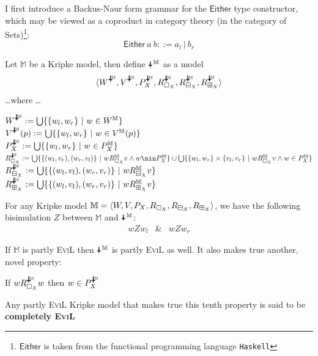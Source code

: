 I first introduce a Backus-Naur form grammar for the $\mathsf{Either}$ type constructor, which may be viewed as a coproduct in category theory (in the category of Sets)\footnote{$\mathsf{Either}$ is taken from the functional programming language \texttt{Haskell}}:
\[ \mathsf{Either}\ a\ b ::= a_l \ |\ b_r \]
\begin{mydef}
Let $\mathbb{M}$ be a Kripke model, then define $\invis^\mathbb{M}$ as a model
\[\la W^{\invis^\mathbb{M}},V^{\invis^\mathbb{M}}, P^{\invis^\mathbb{M}}_X,R^{\invis^\mathbb{M}}_{\Nec_X},R^{\invis^\mathbb{M}}_{\BB_X},R^{\invis^\mathbb{M}}_{\BBI_X}\ra\] 
\ldots where \ldots
\begin{tabbing}
$W^{\invis^\mathbb{M}} := \bigcup\{\{w_l,w_r\}\ |\ w\in W^\mathbb{M}\}$\\
$V^{\invis^\mathbb{M}}(p) := \bigcup\{\{w_l,w_r\}\ |\ w\in V^\mathbb{M}(p)\}$\\
$P^{\invis^\mathbb{M}}_X := \bigcup\{\{w_l,w_r\}\ |\  w\in P^\mathbb{M}_X\}$\\
$R^{\invis^\mathbb{M}}_{\Nec_X} := \bigcup\{\{(w_l,v_r),(w_r,v_l)\}\ |\ w R^\mathbb{M}_{\Nec_X} v \wedge w \nin P^\mathbb{M}_X\} \cup \bigcup\{\{w_l,w_r\}\times \{v_l,v_r\}\ |\ w R^\mathbb{M}_{\Nec_X} v \wedge w \in P^\mathbb{M}_X\}$\\
$R^{\invis^\mathbb{M}}_{\BB_X} := \bigcup\{\{(w_l,v_l),(w_r,v_r)\}\ | \ w R^\mathbb{M}_{\BB_X} v \}$ \\
$R^{\invis^\mathbb{M}}_{\BBI_X} := \bigcup\{\{(w_l,v_l),(w_r,v_r)\}\ | \ w R^\mathbb{M}_{\BBI_X} v \}$
\end{tabbing}

\end{mydef}
\begin{lemma}\label{bisimulation}
For any Kripke model $\mathbb{M} = \langle W,V,P_X,R_{\Box_X},R_{\boxminus_X}, R_{\boxplus_X}\rangle$, we have the following bisimulation $Z$ between $\mathbb{M}$ and $\invis^\mathbb{M}$:
\begin{eqnarray*} w Z w_l & \& & w Z w_r \end{eqnarray*}
\end{lemma}

\begin{lemma}
If $\mathbb{M}$ is partly \textsc{EviL} then $\invis^\mathbb{M}$ is partly \textsc{EviL} as well.  It also makes true another, novel property: 
\begin{mynum}[start=10,resume]
\item If $w R^{\invis^\mathbb{M}}_{\Nec_X} w$ then $w\in P^{\invis^\mathbb{M}}_X$
\end{mynum}
Any partly \textsc{EviL} Kripke model that makes true this tenth property is said to be \textbf{completely \textsc{EviL}}


\end{lemma}

